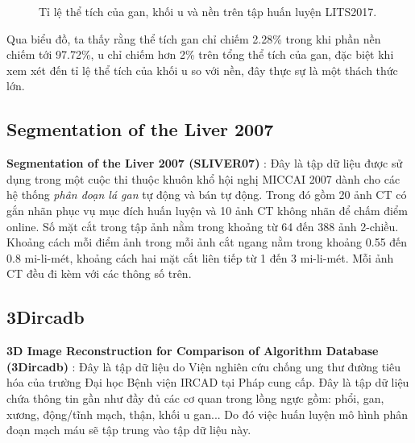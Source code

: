 \begin{figure}[H]
  \centering
  \hfill
  \caption{Tỉ lệ thể tích của gan, khối u và nền trên tập huấn luyện LITS2017.}
\end{figure}

Qua biểu đồ, ta thấy rằng thể tích gan chỉ chiếm 2.28\% trong khi phần nền chiếm tới 97.72\%, u chỉ chiếm hơn 2\% trên tổng thể tích của gan, đặc biệt khi xem xét đến tỉ lệ thể tích của khối u so với nền, đây thực sự là một thách thức lớn.\par

\subsection{Segmentation of the Liver 2007}
\textbf{Segmentation of the Liver 2007 (SLIVER07)} \cite{sliver07}: Đây là tập dữ liệu được sử dụng trong
một cuộc thi thuộc khuôn khổ hội nghị MICCAI 2007 dành cho các hệ thống \textit{phân đoạn
lá gan} tự động và bán tự động. Trong đó gồm 20 ảnh CT có gắn nhãn phục vụ mục đích huấn luyện và 10 ảnh CT không nhãn để chấm điểm online. Số mặt cắt trong tập ảnh nằm trong khoảng từ 64 đến 388
ảnh 2-chiều. Khoảng cách mỗi điểm ảnh trong mỗi ảnh cắt ngang nằm trong khoảng 0.55
đến 0.8 mi-li-mét, khoảng cách hai mặt cắt liên tiếp từ 1 đến 3 mi-li-mét. Mỗi ảnh CT
đều đi kèm với các thông số trên. 

\subsection{3Dircadb}
\textbf{3D Image Reconstruction for Comparison of Algorithm Database (3Dircadb)} \cite{3dircad}: Đây là tập dữ liệu do Viện nghiên cứu chống ung thư đường tiêu hóa của trường Đại học Bệnh viện IRCAD tại Pháp cung cấp. Đây là tập dữ liệu chứa thông tin gần như đầy đủ các cơ quan trong lồng ngực gồm: phổi, gan, xương, động/tĩnh mạch, thận, khối u gan... Do đó việc huấn luyện mô hình phân đoạn mạch máu sẽ tập trung vào tập dữ liệu này. \par

